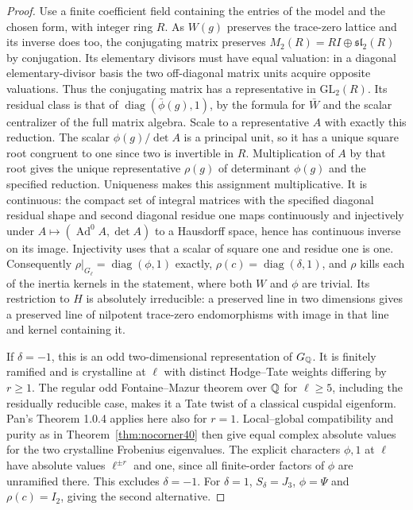 \documentclass[a4paper,11pt]{article}
\theoremstyle{definition}
\theoremstyle{remark}
\numberwithin{equation}{section}
\begin{document}
\begin{proof}
Use a finite coefficient field containing the entries of the model and the chosen form, with integer ring \(R\). As \(W(g)\) preserves the trace-zero lattice and its inverse does too, the conjugating matrix preserves \(M_2(R)=RI\oplus\mathfrak{sl}_2(R)\) by conjugation. Its elementary divisors must have equal valuation: in a diagonal elementary-divisor basis the two off-diagonal matrix units acquire opposite valuations. Thus the conjugating matrix has a representative in \(\mathrm{GL}_2(R)\). Its residual class is that of \(\operatorname{diag}(\bar\phi(g),1)\), by the formula for \(\bar W\) and the scalar centralizer of the full matrix algebra. Scale to a representative \(A\) with exactly this reduction. The scalar \(\phi(g)/\det A\) is a principal unit, so it has a unique square root congruent to one since two is invertible in \(R\). Multiplication of \(A\) by that root gives the unique representative \(\rho(g)\) of determinant \(\phi(g)\) and the specified reduction. Uniqueness makes this assignment multiplicative. It is continuous: the compact set of integral matrices with the specified diagonal residual shape and second diagonal residue one maps continuously and injectively under \(A\mapsto(\operatorname{Ad}^0 A,\det A)\) to a Hausdorff space, hence has continuous inverse on its image. Injectivity uses that a scalar of square one and residue one is one. Consequently \(\rho|_{G_\ell}=\operatorname{diag}(\phi,1)\) exactly, \(\rho(c)=\operatorname{diag}(\delta,1)\), and \(\rho\) kills each of the inertia kernels in the statement, where both \(W\) and \(\phi\) are trivial. Its restriction to \(H\) is absolutely irreducible: a preserved line in two dimensions gives a preserved line of nilpotent trace-zero endomorphisms with image in that line and kernel containing it.

If \(\delta=-1\), this is an odd two-dimensional representation of \(G_\mathbb Q\). It is finitely ramified and is crystalline at \(\ell\) with distinct Hodge--Tate weights differing by \(r\ge1\). The regular odd Fontaine--Mazur theorem over \(\mathbb Q\) for \(\ell\ge5\), including the residually reducible case, makes it a Tate twist of a classical cuspidal eigenform. Pan's Theorem 1.0.4 applies here also for \(r=1\). \cite{VI-IV-VI-pan40} Local--global compatibility and purity as in Theorem~\ref{thm:nocorner40} then give equal complex absolute values for the two crystalline Frobenius eigenvalues. The explicit characters \(\phi,1\) at \(\ell\) have absolute values \(\ell^{\pm r}\) and one, since all finite-order factors of \(\phi\) are unramified there. This excludes \(\delta=-1\). For \(\delta=1\), \(S_\delta=J_3\), \(\phi=\Psi\) and \(\rho(c)=I_2\), giving the second alternative.


\end{proof}
\end{document}
